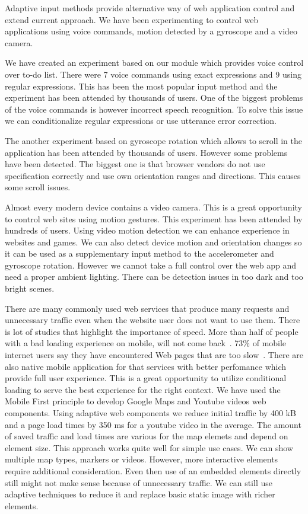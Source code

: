 \documentclass{iitsrc}
\begin{document}

Adaptive input methods provide alternative way of web application control and extend current approach. We have been experimenting to control web applications using voice commands, motion detected by a gyroscope and a video camera. 

We have created an experiment based on our module which provides voice control over to-do list. There were 7 voice commands using exact expressions and 9 using regular expressions. This has been the most popular input method and the experiment has been attended by thousands of users. One of the biggest problems of the voice commands is however incorrect speech recognition. To solve this issue we can conditionalize regular expressions or use utterance error correction.

The another experiment based on gyroscope rotation which allows to scroll in the application has been attended by thousands of users. However some problems have been detected. The biggest one is that browser vendors do not use specification correctly and use own orientation ranges and directions. This causes some scroll issues.

Almost every modern device contains a video camera. This is a great opportunity to control web sites using motion gestures. This experiment has been attended by hundreds of users. Using video motion detection we can enhance experience in websites and games. We can also detect device motion and orientation changes so it can be used as a supplementary input method to the accelerometer and gyroscope rotation. However we cannot take a full control over the web app and need a proper ambient lighting. There can be detection issues in too dark and too bright scenes.


There are many commonly used web services that produce many requests and unnecessary traffic even when the website user does not want to use them. There is lot of studies that highlight the importance of speed. More than half of people with a bad loading experience on mobile, will not come back~\cite{performancebrowsernetworking}. 73\% of mobile internet users say they have encountered Web pages that are too slow~\cite{pagespeed}. There are also native mobile application for that services with better perfomance which provide full user experience. This is a great opportunity to utilize conditional loading to serve the best experience for the right context. We have used the Mobile First principle to develop Google Maps and Youtube videos web components.
Using adaptive web components we reduce initial traffic by 400 kB and a page load times by 350 ms for a youtube video in the average. The amount of saved traffic and load times are various for the map elemets and depend on element size. This approach works quite well for simple use cases. We can show multiple map types, markers or videos. However, more interactive elements require additional consideration. Even then use of an embedded elements directly still might not make sense because of unnecessary traffic. We can still use adaptive techniques to reduce it and replace basic static image with richer elements.
\end{document}
